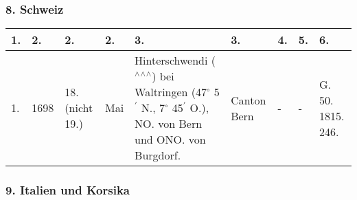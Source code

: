 \documentclass[a4paper, 8pt, oneside, polutonikogreek, german]{article}
\begin{document}
\subsubsection{8. Schweiz}
\begin{table}[!ht]
    \centering
    \begin{tabular}{|l|l|l|l|l|l|l|l|l|}
    \hline
        1. & 2. & 2. & 2. & 3. & 3. & 4. & 5. & 6. \\ \hline
        1. & 1698 & 18. (nicht 19.) & Mai & Hinterschwendi ($^\wedge$$^\wedge$$^\wedge$) bei Waltringen (47$^\circ$ 5$^\prime$ N., 7$^\circ$ 45$^\prime$ O.), NO. von Bern und ONO. von Burgdorf. & Canton Bern & - & - & G. 50. 1815. 246. \\ \hline
    \end{tabular}
\end{table}
\clearpage
\subsubsection{9. Italien und Korsika}
\end{document}
